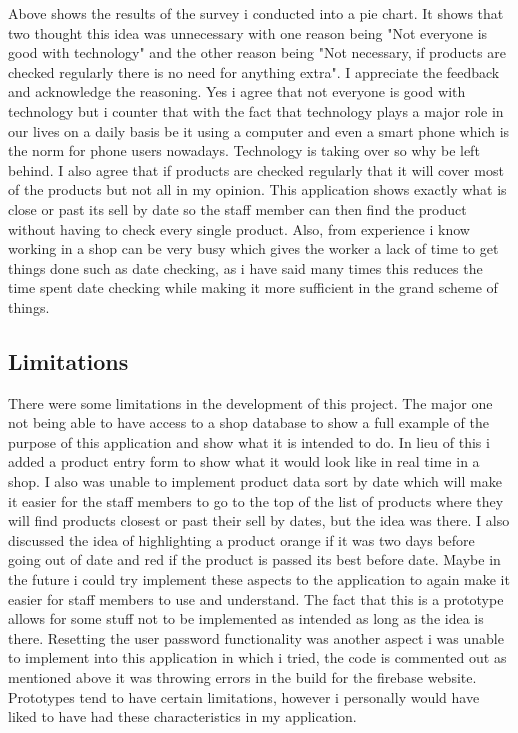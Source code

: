 Above shows the results of the survey i conducted into a pie chart. It shows that two thought this idea was unnecessary with one reason being "Not everyone is good with technology" and the other reason being "Not necessary, if products are checked regularly there is no need for anything extra". I appreciate the feedback and acknowledge the reasoning. Yes i agree that not everyone is good with technology but i counter that with the fact that technology plays a major role in our lives on a daily basis be it using a computer and even a smart phone which is the norm for phone users nowadays. Technology is taking over so why be left behind. I also agree that if products are checked regularly that it will cover most of the products but not all in my opinion. This application shows exactly what is close or past its sell by date so the staff member can then find the product without having to check every single product. Also, from experience i know working in a shop can be very busy which gives the worker a lack of time to get things done such as date checking, as i have said many times this reduces the time spent date checking while making it more sufficient in the grand scheme of things. 
\newpage
\subsection{Limitations}
There were some limitations in the development of this project. The major one not being able to have access to a shop database to show a full example of the purpose of this application and show what it is intended to do. In lieu of this i added a product entry form to show what it would look like in real time in a shop. I also was unable to implement product data sort by date which will make it easier for the staff members to go to the top of the list of products where they will find products closest or past their sell by dates, but the idea was there. I also discussed the idea of highlighting a product orange if it was two days before going out of date and red if the product is passed its best before date. Maybe in the future i could try implement these aspects to the application to again make it easier for staff members to use and understand. The fact that this is a prototype allows for some stuff not to be implemented as intended as long as the idea is there. Resetting the user password functionality was another aspect i was unable to implement into this application in which i tried, the code is commented out as mentioned above it was throwing errors in the build for the firebase website. Prototypes tend to have certain limitations, however i personally would have liked to have had these characteristics in my application.